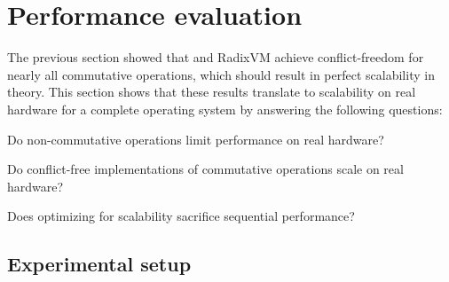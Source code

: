 
\section{Performance evaluation}
\label{sec:eval}

The previous section showed that \fs and RadixVM achieve conflict-freedom
for nearly all commutative operations, which should result
in perfect scalability in
theory.  This section shows that these results translate to scalability on
real hardware for a complete operating system by answering the following
questions:

\begin{CompactItemize}

\item Do non-commutative operations limit performance on real
  hardware?

\item Do conflict-free implementations of commutative operations scale
  on real hardware?

\item Does optimizing for scalability sacrifice sequential performance?

\end{CompactItemize}








\subsection{Experimental setup}
\label{sec:topic:ben}

